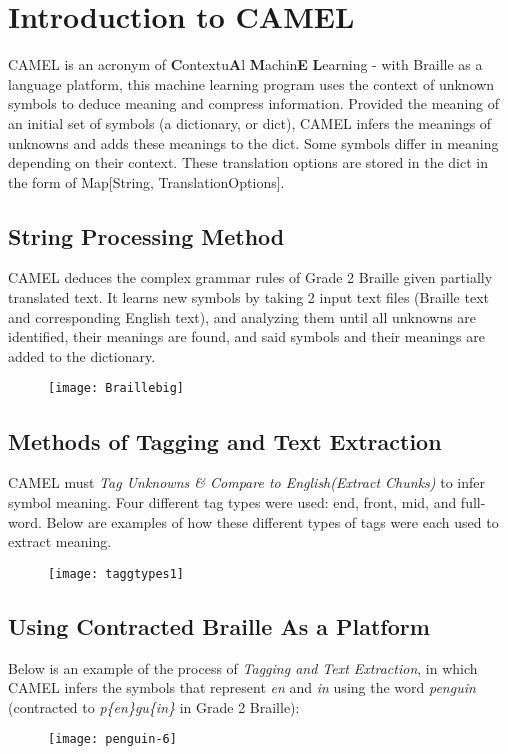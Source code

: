 \documentclass[26pt]{article}
\newcommand*{\code}{\fontfamily{pcr}\selectfont}
\begin{document}
\section{Introduction to CAMEL}

CAMEL is an acronym of \textbf{C}ontextu\textbf{A}l \textbf{M}achin\textbf{E} \textbf{L}earning - with Braille as a language platform, this machine learning program uses the context of unknown symbols to deduce meaning and compress information. Provided the meaning of an initial set of symbols (a dictionary, or {\code dict}), CAMEL infers the meanings of unknowns and adds these meanings to the {\code dict}. Some symbols differ in meaning depending on their context. These translation options are stored in the {\code dict} in the form of {\code Map[String, TranslationOptions]}.


\subsection{String Processing Method}

CAMEL deduces the complex grammar rules of Grade 2 Braille given partially translated text. It learns new symbols by taking 2 input text files (Braille text and corresponding English text), and analyzing them until all unknowns are identified, their meanings are found, and said symbols and their meanings are added to the dictionary. 

\begin{figure}[ht!] \centering
	\texttt{[image: Braillebig]}
	\end{figure}

\subsection{Methods of Tagging and Text Extraction}

CAMEL must \textit{Tag Unknowns \& Compare to English(Extract Chunks)}  to infer symbol meaning. Four different tag types were used: end, front, mid, and full-word. Below are examples of how these different types of tags were each used to extract meaning. 
\begin{figure}[ht!]\centering
	\texttt{[image: taggtypes1]}
	\end{figure}
\clearpage

\subsection{Using Contracted Braille As a Platform}
Below is an example of the process of \textit{Tagging and Text Extraction}, in which CAMEL infers the symbols that represent \textit{en} and \textit{in} using the word \textit{penguin} (contracted to \textit{p\{en\}gu\{in\}} in Grade 2 Braille):
          \begin{figure}[ht!] \centering
	\texttt{[image: penguin-6]}
	\end{figure}
\clearpage
\end{document}
